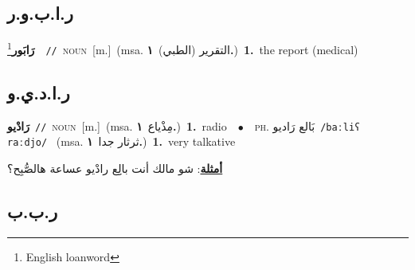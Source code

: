 \documentclass[10pt,a4paper,twoside]{article} %
\begin{document}
\begin{multicols}{2}
\vspace{-3mm}
\subsection*{\color{blue}\foreignlanguage{arabic}{ر.ا.ب.و.ر}\color{blue}{ (ntws)}} 

{\setlength\topsep{0pt}\textbf{\foreignlanguage{arabic}{رَابَور}}\footnote{English loanword}\ \ {\color{gray}\texttt{//}\color{black}}\ \textsc{noun}\ [m.]\ \color{gray}(msa. \foreignlanguage{arabic}{التقرير (الطبي)}~\foreignlanguage{arabic}{\textbf{١.}})\color{black}\ \textbf{1.}~the report (medical)\ } \vspace{2mm}

\vspace{-3mm}
\subsection*{\color{blue}\foreignlanguage{arabic}{ر.ا.د.ي.و}\color{blue}{ (ntws)}} 

{\setlength\topsep{0pt}\textbf{\foreignlanguage{arabic}{رَادْيو}}\ {\color{gray}\texttt{//}\color{black}}\ \textsc{noun}\ [m.]\ \color{gray}(msa. \foreignlanguage{arabic}{مِذْياع}~\foreignlanguage{arabic}{\textbf{١.}})\color{black}\ \textbf{1.}~radio\ \ $\bullet$\ \ \textsc{ph.} \color{gray} \foreignlanguage{arabic}{بَالع رَاديو}\color{black}\ {\color{gray}\texttt{/{\sffamily baːliʕ raːdjo}/}\color{black}}\ \color{gray} (msa. \foreignlanguage{arabic}{ثرثار جدا}~\foreignlanguage{arabic}{\textbf{١.}})\color{black}\ \textbf{1.}~very talkative\  \begin{flushright}\color{gray}\foreignlanguage{arabic}{\textbf{\underline{\foreignlanguage{arabic}{أمثلة}}}: شو مالك أنت بالِِع رادْيو عساعة هالصُّبِح؟}\end{flushright}\color{black}} \vspace{2mm}

\vspace{-3mm}
\subsection*{\color{blue}\foreignlanguage{arabic}{ر.ب.ب}\color{blue}{}} 


\end{multicols}
\end{document}
